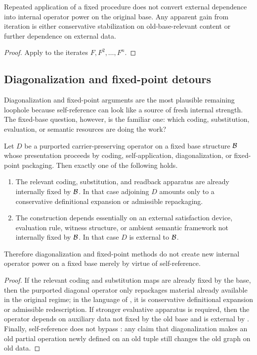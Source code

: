 \begin{corollary}\label{cor:no-bootstrapping}
Repeated application of a fixed procedure does not convert external dependence into internal operator power on the original base. Any apparent gain from iteration is either conservative stabilization on old-base-relevant content or further dependence on external data.
\end{corollary}

\begin{proof}
Apply  to the iterates $F,F^2,\dots,F^n$.
\end{proof}

\subsection{Diagonalization and fixed-point detours}

Diagonalization and fixed-point arguments are the most plausible remaining loophole because self-reference can look like a source of fresh internal strength. The fixed-base question, however, is the familiar one: which coding, substitution, evaluation, or semantic resources are doing the work?

\begin{proposition}\label{prop:diagonalization}
Let $D$ be a purported carrier-preserving operator on a fixed base structure $\mathcal{B}$ whose presentation proceeds by coding, self-application, diagonalization, or fixed-point packaging. Then exactly one of the following holds.
\begin{enumerate}[label=(\alph*)]
    \item The relevant coding, substitution, and readback apparatus are already internally fixed by $\mathcal{B}$. In that case adjoining $D$ amounts only to a conservative definitional expansion or admissible repackaging.
    \item The construction depends essentially on an external satisfaction device, evaluation rule, witness structure, or ambient semantic framework not internally fixed by $\mathcal{B}$. In that case $D$ is external to $\mathcal{B}$.
\end{enumerate}
Therefore diagonalization and fixed-point methods do not create new internal operator power on a fixed base merely by virtue of self-reference.
\end{proposition}

\begin{proof}
If the relevant coding and substitution maps are already fixed by the base, then the purported diagonal operator only repackages material already available in the original regime; in the language of , it is conservative definitional expansion or admissible redescription. If stronger evaluative apparatus is required, then the operator depends on auxiliary data not fixed by the old base and is external by . Finally, self-reference does not bypass : any claim that diagonalization makes an old partial operation newly defined on an old tuple still changes the old graph on old data.
\end{proof}

